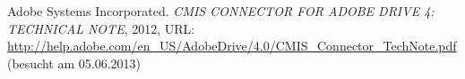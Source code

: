 {}
\begin{thebibliography}{-----------------}

Adobe Systems Incorporated. \textit{CMIS CONNECTOR FOR ADOBE DRIVE 4: TECHNICAL NOTE}, 2012, URL: \url{http://help.adobe.com/en_US/AdobeDrive/4.0/CMIS_Connector_TechNote.pdf} (besucht am 05.06.2013)

\end{thebibliography}



